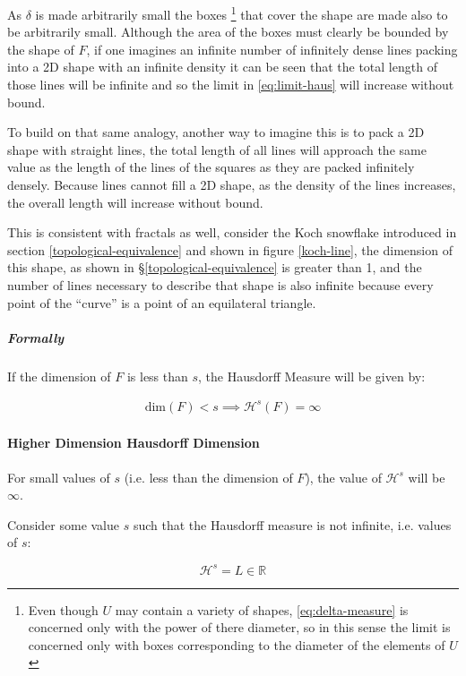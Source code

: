 \documentclass[a4paper,11pt,twoside]{article}
\begin{document}
As \(\delta\) is made arbitrarily small the boxes \footnote{Even though \(U\) may contain a variety of shapes, \eqref{eq:delta-measure} is concerned only with the power of there diameter, so in this sense the limit is concerned only with boxes corresponding to the diameter of the elements of \(U\)} that cover the shape are made also to be arbitrarily small. Although the area of the boxes must clearly be bounded by the shape of \(F\), if one imagines an infinite number of infinitely dense lines packing into a 2D shape with an infinite density it can be seen that the total length of those lines will be infinite and so the limit in \eqref{eq:limit-haus} will increase without bound.

To build on that same analogy, another way to imagine this is to pack a 2D shape with straight lines, the total length of all lines will approach the same value as the length of the lines of the squares as they are packed infinitely densely. Because lines cannot fill a 2D shape, as the density of the lines increases, the overall length will increase without bound.

This is consistent with fractals as well, consider the Koch snowflake introduced in section \ref{topological-equivalence} and shown in figure \ref{koch-line}, the dimension of this shape, as shown in \S \ref{topological-equivalence} is greater than 1, and the number of lines necessary to describe that shape is also infinite because every point of the ``curve'' is a point of an equilateral triangle.

\subparagraph{Formally}
\label{sec:orgba75fb7}
If the dimension of \(F\) is less than \(s\), the Hausdorff Measure will be given by:

\begin{align}
\mathrm{dim}\left(  F \right ) < s \implies \mathcal{H}^{s} \left( F \right)  = \infty
\end{align}

\paragraph{Higher Dimension Hausdorff Dimension}
\label{sec:orgfaba2d9}


For small values of \(s\) (i.e. less than the dimension of  \(F\)), the value of \(\mathcal{H}^s\)  will be \(\infty\).

Consider some value \(s\) such that the Hausdorff measure is not infinite, i.e. values of \(s\):

\[
\mathcal{H}^s = L \in \mathbb{R}
\]
\end{document}
